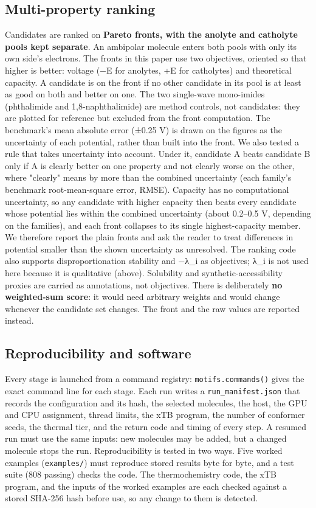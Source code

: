 \documentclass[journal=jcisd8,manuscript=article]{achemso}
\begin{document}
\subsection{Multi-property ranking}

Candidates are ranked on \textbf{Pareto fronts, with the anolyte and catholyte pools kept separate}. An ambipolar molecule enters both pools with only its own side's electrons. The fronts in this paper use two objectives, oriented so that higher is better: voltage (−E for anolytes, +E for catholytes) and theoretical capacity. A candidate is on the front if no other candidate in its pool is at least as good on both and better on one. The two single-wave mono-imides (phthalimide and 1,8-naphthalimide) are method controls, not candidates: they are plotted for reference but excluded from the front computation. The benchmark's mean absolute error (±0.25 V) is drawn on the figures as the uncertainty of each potential, rather than built into the front. We also tested a rule that takes uncertainty into account. Under it, candidate A beats candidate B only if A is clearly better on one property and not clearly worse on the other, where "clearly" means by more than the combined uncertainty (each family's benchmark root-mean-square error, RMSE). Capacity has no computational uncertainty, so any candidate with higher capacity then beats every candidate whose potential lies within the combined uncertainty (about 0.2–0.5 V, depending on the families), and each front collapses to its single highest-capacity member. We therefore report the plain fronts and ask the reader to treat differences in potential smaller than the shown uncertainty as unresolved. The ranking code also supports disproportionation stability and −λ\_i as objectives; λ\_i is not used here because it is qualitative (above). Solubility and synthetic-accessibility proxies are carried as annotations, not objectives. There is deliberately \textbf{no weighted-sum score}: it would need arbitrary weights and would change whenever the candidate set changes. The front and the raw values are reported instead.

\subsection{Reproducibility and software}

Every stage is launched from a command registry: \texttt{motifs.commands()} gives the exact command line for each stage. Each run writes a \texttt{run\_manifest.json} that records the configuration and its hash, the selected molecules, the host, the GPU and CPU assignment, thread limits, the xTB program, the number of conformer seeds, the thermal tier, and the return code and timing of every step. A resumed run must use the same inputs: new molecules may be added, but a changed molecule stops the run. Reproducibility is tested in two ways. Five worked examples (\texttt{examples/}) must reproduce stored results byte for byte, and a test suite (808 passing) checks the code. The thermochemistry code, the xTB program, and the inputs of the worked examples are each checked against a stored SHA-256 hash before use, so any change to them is detected.
\end{document}
